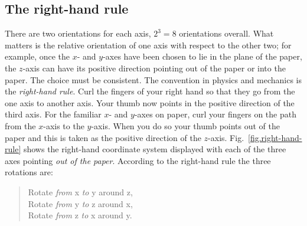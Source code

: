
\subsection{The right-hand rule}

There are two orientations for each axis, $2^3=8$ orientations overall. What matters is the relative orientation of one axis with respect to the other two; for example, once the $x$- and $y$-axes have been chosen to lie in the plane of the paper, the $z$-axis can have its positive direction pointing out of the paper or into the paper. The choice must be consistent. The convention in physics and mechanics is the \emph{right-hand rule}. Curl the fingers of your right hand so that they go from the one axis to another axis. Your thumb now points in the positive direction of the third axis. For the familiar $x$- and $y$-axes on paper, curl your fingers on the path from the $x$-axis to the $y$-axis. When you do so your thumb points out of the paper and this is taken as the positive direction of the $z$-axis. Fig.~\ref{fig.right-hand-rule} shows the right-hand coordinate system displayed with each of the three axes pointing \emph{out of the paper}. According to the right-hand rule the three rotations are:
\begin{quote}
\normalsize
Rotate \emph{from} x \emph{to} y around z,\\
Rotate \emph{from} y \emph{to} z around x,\\
Rotate \emph{from} z \emph{to} x around y.
\end{quote}

